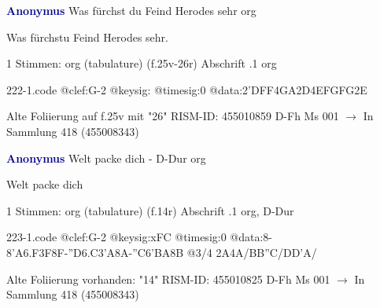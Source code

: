 \documentclass[twocolumn]{book}
\begin{document}
\newline \par \vspace{7pt} \textcolor{darkblue}{\textbf{Anonymus  }}
\newline Was fürchst du Feind Herodes sehr
\newline org
\newline \begin{itshape}[f.25v, at left:] Was fürchstu Feind Herodes sehr.\end{itshape} 
\newline \textcolor{darkblue}{}  1 Stimmen: org (tabulature)  (f.25v-26r)
\newline Abschrift
.1  org  
\begin{filecontents*}{222-1.code}
@clef:G-2
@keysig:
@timesig:0
@data:2'DFF4GA2D4EFGFG2E
\end{filecontents*}
\newline
%
\newline Alte Foliierung auf f.25v mit "26"
\newline RISM-ID: 455010859
\newline D-Fh  Ms 001
\newline $\rightarrow$ In Sammlung 418 (455008343)
      
\newline \par \vspace{7pt} \textcolor{darkblue}{\textbf{Anonymus  }}
\newline Welt packe dich - D-Dur
\newline org
\newline \begin{itshape}[f.14r, at left:] Welt packe dich\end{itshape} 
\newline \textcolor{darkblue}{}  1 Stimmen: org (tabulature)  (f.14r)
\newline Abschrift
.1  org, D-Dur  
\begin{filecontents*}{223-1.code}
@clef:G-2
@keysig:xFC
@timesig:0
@data:8-{8'A6.F3F}8F-{''D6.C3'A}8A-''C{6'BA}8B @3/4 2A4A/BB''C/DD'A/
\end{filecontents*}
\newline
%
\newline Alte Foliierung vorhanden: "14"
\newline RISM-ID: 455010825
\newline D-Fh  Ms 001
\newline $\rightarrow$ In Sammlung 418 (455008343)
      
\end{document}
